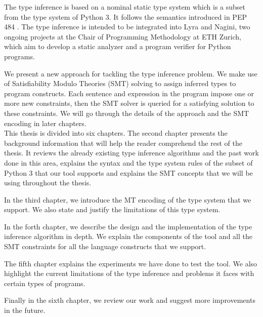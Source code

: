 The type inference is based on a nominal static type system which is a subset from the type system of Python 3. It follows the semantics introduced in PEP 484 \cite{484}. The type inference is intended to be integrated into Lyra and Nagini, two ongoing projects at the Chair of Programming Methodology at ETH Zurich, which aim to develop a static analyzer and a program verifier for Python programs.

We present a new approach for tackling the type inference problem. We make use of Satisfiability Modulo Theories (SMT) solving to assign inferred types to program constructs. Each sentence and expression in the program impose one or more new constraints, then the SMT solver is queried for a satisfying solution to these constraints. We will go through the details of the approach and the SMT encoding in later chapters.\\
 
This thesis is divided into six chapters. The second chapter presents the background information that will help the reader comprehend the rest of the thesis. It reviews the already existing type inference algorithms and the past work done in this area, explains the syntax and the type system rules of the subset of Python 3 that our tool supports and explains the SMT concepts that we will be using throughout the thesis.

In the third chapter, we introduce the MT encoding of the type system that we support. We also state and justify the limitations of this type system.

In the forth chapter, we describe the design and the implementation of the type inference algorithm in depth. We explain the components of the tool and all the SMT constraints for all the language constructs that we support.

The fifth chapter explains the experiments we have done to test the tool. We also highlight the current limitations of the type inference and problems it faces with certain types of programs.

Finally in the sixth chapter, we review our work and suggest more improvements in the future.